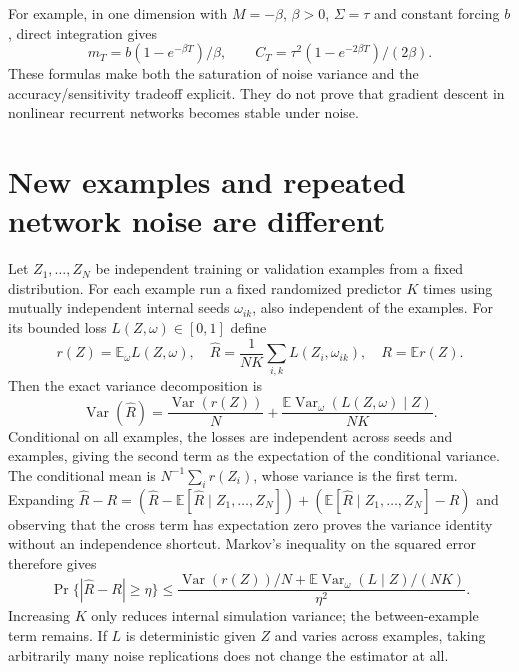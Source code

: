 \documentclass[11pt]{article}
\begin{document}
For example, in one dimension with $M=-\beta$, $\beta>0$,
$\Sigma=\tau$ and constant forcing $b$, direct integration gives
\[
 m_T=b(1-e^{-\beta T})/\beta,\qquad
 C_T=\tau^2(1-e^{-2\beta T})/(2\beta).
\]
These formulas make both the saturation of noise variance and
the accuracy/sensitivity tradeoff explicit. They do not prove
that gradient descent in nonlinear recurrent networks becomes
stable under noise.

\section{New examples and repeated network noise are different}
Let $Z_1,\ldots,Z_N$ be independent training or validation
examples from a fixed distribution. For each example run a
fixed randomized predictor $K$ times using mutually independent
internal seeds $\omega_{ik}$, also independent of the examples.
For its bounded loss $L(Z,\omega)\in[0,1]$ define
\[
 r(Z)=\mathbb E_\omega L(Z,\omega),\quad
 \widehat R=\frac1{NK}\sum_{i,k}L(Z_i,\omega_{ik}),\quad
 R=\mathbb E r(Z).
\]
Then the exact variance decomposition is
\[
 \operatorname{Var}(\widehat R)
 =\frac{\operatorname{Var}(r(Z))}{N}
 +\frac{\mathbb E\operatorname{Var}_\omega(L(Z,\omega)\mid Z)}{NK}.
\]
Conditional on all examples, the losses are independent across
seeds and examples, giving the second term as the expectation
of the conditional variance. The conditional mean is
$N^{-1}\sum_i r(Z_i)$, whose variance is the first term.
Expanding
$\widehat R-R=(\widehat R-\mathbb E[\widehat R\mid Z_1,\ldots,Z_N])
 +(\mathbb E[\widehat R\mid Z_1,\ldots,Z_N]-R)$
and observing that the cross term has expectation zero proves
the variance identity without an independence shortcut.
Markov's inequality on the squared error therefore gives
\[
 \Pr\{|\widehat R-R|\ge\eta\}
 \le\frac{\operatorname{Var}(r(Z))/N+
       \mathbb E\operatorname{Var}_\omega(L\mid Z)/(NK)}{\eta^2}.
\]
Increasing $K$ only reduces internal simulation variance; the
between-example term remains. If $L$ is deterministic given
$Z$ and varies across examples, taking arbitrarily many noise
replications does not change the estimator at all.
\end{document}
